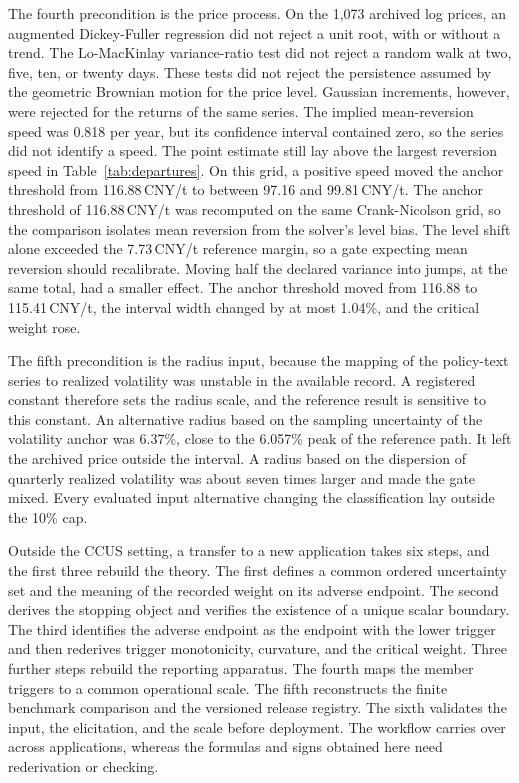 \documentclass[5p,times,authoryear]{elsarticle}
\theoremstyle{plain}
\begin{document}
The fourth precondition is the price process. On the 1,073 archived log prices, an augmented Dickey-Fuller regression did not reject a unit root, with or without a trend. The Lo-MacKinlay variance-ratio test did not reject a random walk at two, five, ten, or twenty days. These tests did not reject the persistence assumed by the geometric Brownian motion for the price level. Gaussian increments, however, were rejected for the returns of the same series. The implied mean-reversion speed was 0.818 per year, but its confidence interval contained zero, so the series did not identify a speed. The point estimate still lay above the largest reversion speed in Table~\ref{tab:departures}. On this grid, a positive speed moved the anchor threshold from 116.88\,CNY/t to between 97.16 and 99.81\,CNY/t. The anchor threshold of 116.88\,CNY/t was recomputed on the same Crank-Nicolson grid, so the comparison isolates mean reversion from the solver's level bias. The level shift alone exceeded the 7.73\,CNY/t reference margin, so a gate expecting mean reversion should recalibrate. Moving half the declared variance into jumps, at the same total, had a smaller effect. The anchor threshold moved from 116.88 to 115.41\,CNY/t, the interval width changed by at most 1.04\%, and the critical weight rose.

The fifth precondition is the radius input, because the mapping of the policy-text series to realized volatility was unstable in the available record. A registered constant therefore sets the radius scale, and the reference result is sensitive to this constant. An alternative radius based on the sampling uncertainty of the volatility anchor was 6.37\%, close to the 6.057\% peak of the reference path. It left the archived price outside the interval. A radius based on the dispersion of quarterly realized volatility was about seven times larger and made the gate mixed. Every evaluated input alternative changing the classification lay outside the 10\% cap.

Outside the CCUS setting, a transfer to a new application takes six steps, and the first three rebuild the theory. The first defines a common ordered uncertainty set and the meaning of the recorded weight on its adverse endpoint. The second derives the stopping object and verifies the existence of a unique scalar boundary. The third identifies the adverse endpoint as the endpoint with the lower trigger and then rederives trigger monotonicity, curvature, and the critical weight. Three further steps rebuild the reporting apparatus. The fourth maps the member triggers to a common operational scale. The fifth reconstructs the finite benchmark comparison and the versioned release registry. The sixth validates the input, the elicitation, and the scale before deployment. The workflow carries over across applications, whereas the formulas and signs obtained here need rederivation or checking.
\end{document}
